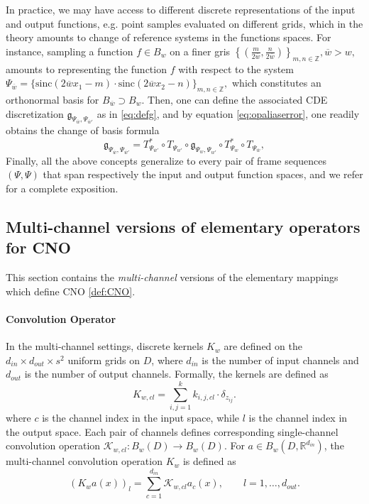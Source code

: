 \documentclass[reqno,10pt]{amsart}
\theoremstyle{plain}
\newcommand{\sinc}{\text{sinc}}
\theoremstyle{definition}
\newcommand{\bb}[1]{\mathbb{#1}}
\newcommand{\cal}[1]{\mathcal{#1}}
\begin{document}
    \noindent In practice, we may have access to different discrete representations of the input and output functions, e.g. point samples evaluated on different grids, which in the theory amounts to change of reference systems in the functions spaces. For instance, sampling a function $f\in B_w$ on a finer gris $\left\{(\frac{m}{2\overline{w}},\frac{n}{2\overline{w}})\right\}_{m,n \in \bb Z},\overline{w} > w,$ amounts to representing the function $f$ with respect to the system $\Psi_{\overline{w}} = \{\sinc(2\overline{w}x_1 - m) \cdot \sinc(2\overline{w}x_2 - n)\}_{m,n \in \bb Z},$ which constitutes an orthonormal basis for $B_{\overline{w}} \supset B_w$. Then, one can define the associated CDE discretization $\mathfrak{g}_{\Psi_{\overline{w}},\Psi_{\overline{w}'}}$ as in \ref{eq:defg}, and by equation \ref{eq:opaliaserror}, one readily obtains the change of basis formula
    \begin{equation}
        \mathfrak{g}_{\Psi_{\overline{w}},\Psi_{\overline{w}'}} = T^*_{\Psi_{\overline{w}'}} \circ T_{\Psi_{w'}} \circ \mathfrak{g}_{\Psi_w,\Psi_{w'}} \circ T^*_{\Psi_w} \circ T_{\Psi_{\overline{w}}},
    \end{equation}
    Finally, all the above concepts generalize to every pair of frame sequences $(\Psi,\Psi)$ that span respectively the input and output function spaces, and we refer \cite{FB2023} for a complete exposition.

    \subsection{Multi-channel versions of elementary operators for CNO}\label{appendix:A.3}
    This section contains the {\it multi-channel} versions of the elementary mappings which define CNO \ref{def:CNO}.

    \paragraph{\bf Convolution Operator} In the multi-channel settings, discrete kernels $K_w$ are defined on the $d_{in} \times d_{out} \times s^2$ uniform grids on $D$, where $d_{in}$ is the number of input channels and $d_{out}$ is the number of output channels. Formally, the kernels are defined as
    $$ K_{w,cl} = \sum_{i,j=1}^{k} k_{i,j,cl} \cdot \delta_{z_{ij}}.$$
    where $c$ is the channel index in the input space, while $l$ is the channel index in the output space. Each pair of channels defines corresponding single-channel convolution operation $\cal K_{w,cl} : B_w(D) \to B_w(D)$. For $a \in B_w(D,\bb R^{d_{in}})$, the multi-channel convolution operation $K_w$ is defined as
    $$ (K_wa(x))_l = \sum_{c=1}^{d_{in}} \cal K_{w,cl} a_c(x), \qquad l=1, \dots, d_{out}. $$
\end{document}
